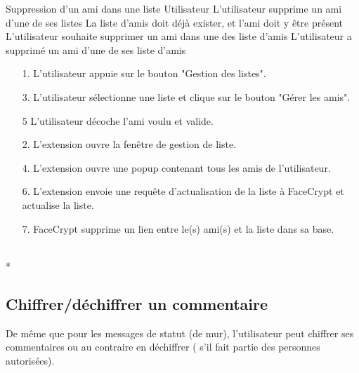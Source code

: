 \documentclass[a4paper,11pt,french]{article}
\begin{document}
\fiche
	{Suppression d'un ami dans une liste}
	{Utilisateur}
    {L'utilisateur supprime un ami d'une de ses listes}
    {La liste d'amis doit déjà exister, et l'ami doit y être présent}
    {L'utilisateur souhaite supprimer un ami dans une des liste d'amis}
	{L'utilisateur a supprimé un ami d'une de ses liste d'amis}
    {\begin{itemize}
        \item[]
        \item[1.] L'utilisateur appuie sur le bouton "Gestion des listes".
        \item[3.] L'utilisateur sélectionne une liste et clique sur le bouton 
        "Gérer les amis".
        \item[5] L'utilisateur décoche l'ami voulu et valide.
    \end{itemize}}
	{\begin{itemize}
        \item[]
        \item[2.] L'extension ouvre la fenêtre de gestion de liste.
		\item[4.] L'extension ouvre une popup contenant tous les amis de 
		l'utilisateur.
		\item[6.] L'extension envoie une requête d'actualisation de la liste à 
		FaceCrypt et actualise la liste.
		\item[7.] FaceCrypt supprime un lien entre le(s) ami(s) et la liste
		dans sa base.
	\end{itemize}
	}
	{}
\flots
    {}
    {}
\\*

\subsection{Chiffrer/déchiffrer un commentaire}
De même que pour les messages de statut (de mur), l'utilisateur
peut chiffrer ses commentaires ou au contraire en déchiffrer (
s'il fait partie des personnes autorisées).
\end{document}
